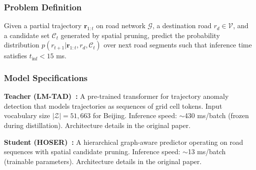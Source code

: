 \subsubsection{Problem Definition}
\label{sec:method-problem}

\begin{definition}
Given a partial trajectory $\mathbf{r}_{1:t}$ on road network $\mathcal{G}$, a destination road $r_d \in \mathcal{V}$, and a candidate set $\mathcal{C}_t$ generated by spatial pruning, predict the probability distribution $p(r_{t+1} | \mathbf{r}_{1:t}, r_d, \mathcal{C}_t)$ over next road segments such that inference time satisfies $t_{\text{inf}} < 15$ ms.
\end{definition}

\subsubsection{Model Specifications}
\label{sec:method-models}

\textbf{Teacher (LM-TAD)~\cite{mbuyaTrajectoryAnomalyDetection2024}:} A pre-trained transformer for trajectory anomaly detection that models trajectories as sequences of grid cell tokens. Input vocabulary size $|\mathcal{Z}| = 51{,}663$ for Beijing. Inference speed: $\sim$430 ms/batch (frozen during distillation). Architecture details in the original paper.

\textbf{Student (HOSER)~\cite{caoHolisticSemanticRepresentation2025}:} A hierarchical graph-aware predictor operating on road sequences with spatial candidate pruning. Inference speed: $\sim$13 ms/batch (trainable parameters). Architecture details in the original paper.

